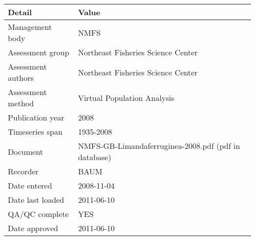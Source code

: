 \begin{table}[htb]
\centering
\begin{tabular}{lp{7cm}}
\toprule
Detail & Value \\
\midrule
Management body    & NMFS                                                 \\
Assessment group   & Northeast Fisheries Science Center                   \\
Assessment authors & Northeast Fisheries Science Center                   \\
Assessment method  & Virtual Population Analysis                          \\
Publication year   & 2008                                                 \\
Timeseries span    & 1935-2008                                            \\
Document           & NMFS-GB-Limandaferruginea-2008.pdf (pdf in database) \\
Recorder           & BAUM                                                 \\
Date entered       & 2008-11-04                                           \\
Date last loaded   & 2011-06-10                                           \\
QA/QC complete     & YES                                                  \\
Date approved      & 2011-06-10                                           \\
\bottomrule
\end{tabular}
\label{tab:assessdet}
\end{table}
